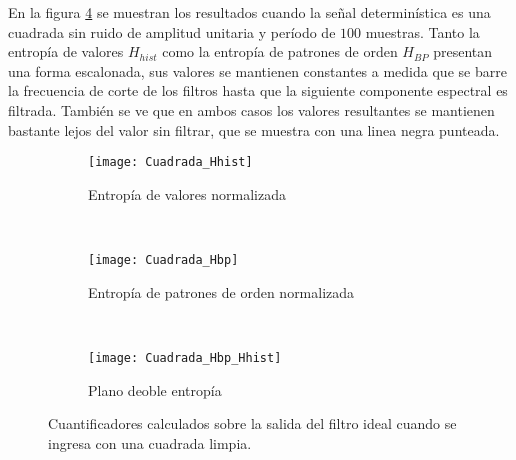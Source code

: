 En la figura \ref{fig:Cuadrada} se muestran los resultados cuando la señal determinística es una cuadrada sin ruido de amplitud unitaria y período de $100$ muestras. Tanto la entropía de valores $H_{hist}$ como la entropía de patrones de orden $H_{BP}$ presentan una forma escalonada, sus valores se mantienen constantes a medida que se barre la frecuencia de corte de los filtros hasta que la siguiente componente espectral es filtrada. También se ve que en ambos casos los valores resultantes se mantienen bastante lejos del valor sin filtrar, que se muestra con una linea negra punteada.
%
\begin{figure}[h]
    \centering
    \begin{subfigure}[t]{0.32\textwidth}
        \texttt{[image: Cuadrada\_Hhist]}
        \caption{Entropía de valores normalizada}
        \label{subfig:Cuadrada_Hhist}
    \end{subfigure}
    ~ %
    \begin{subfigure}[t]{0.32\textwidth}
        \texttt{[image: Cuadrada\_Hbp]}
        \caption{Entropía de patrones de orden normalizada}
        \label{subfig:Cuadrada_Hbp}
    \end{subfigure}
    ~ %
    \begin{subfigure}[t]{0.32\textwidth}
        \texttt{[image: Cuadrada\_Hbp\_Hhist]}
        \caption{Plano deoble entropía}
        \label{subfig:Cuadrada_HbpHhist}
    \end{subfigure}
    \caption{Cuantificadores calculados sobre la salida del filtro ideal cuando se ingresa con una cuadrada limpia.}\label{fig:Cuadrada}
\end{figure}

